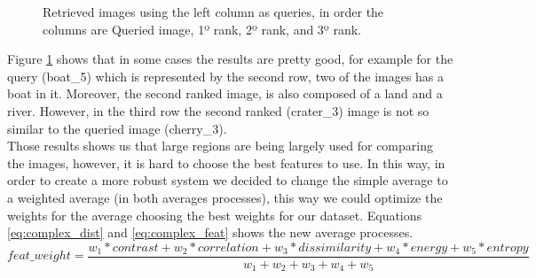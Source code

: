 \documentclass[12pt,a4paper]{article}
\begin{document}
\begin{figure}[!h]
{{		}
	}
	\enskip
	{
		{
			\setlength{\fboxsep}{1pt}
			\setlength{\fboxrule}{1pt}
		}
	}
	
		
	\caption{Retrieved images using the left column as queries, in order the columns are Queried image, 1º rank, 2º rank, and 3º rank.}
	\label{fig:simpleAvr}
\end{figure}

Figure \ref{fig:simpleAvr} shows that in some cases the results are pretty good, for example for the query (boat\_5) which is represented by the second row, two of the images has a boat in it. Moreover, the second ranked image, is also composed of a land and a river. However, in the third row the second ranked (crater\_3) image is not so similar to the queried image (cherry\_3). \\ 

Those results shows us that large regions are being largely used for comparing the images, however, it is hard to choose the best features to use. In this way, in order to create a more robust system we decided to change the simple average to a weighted average (in both averages processes), this way we could optimize the weights for the average choosing the best weights for our dataset. Equations \ref{eq:complex_dist} and \ref{eq:complex_feat} shows the new average processes. \\

\begin{equation}
feat\_weight =  \frac{w_1 * contrast + w_2 * correlation + w_3 * dissimilarity + w_4 *  energy + w_5 * entropy}{w_1 + w_2 + w_3 + w_4 + w_5}
\label{eq:complex_dist}
\end{equation}
\end{document}
